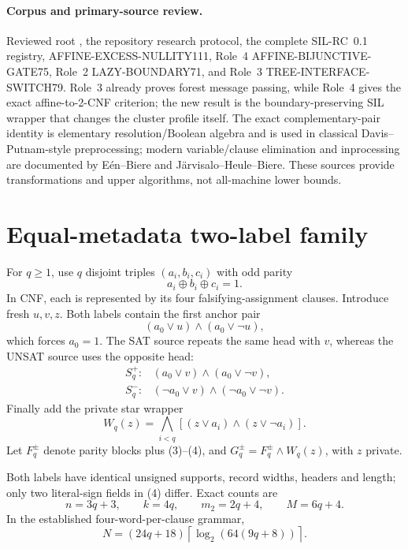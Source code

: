 \documentclass[11pt]{article}
\begin{document}
\paragraph{Corpus and primary-source review.}
Reviewed root , the repository research protocol, the complete
SIL-RC~0.1 registry, AFFINE-EXCESS-NULLITY111, Role~4
AFFINE-BIJUNCTIVE-GATE75, Role~2 LAZY-BOUNDARY71, and Role~3
TREE-INTERFACE-SWITCH79.  Role~3 already proves forest message passing, while
Role~4 gives the exact affine-to-2-CNF criterion; the new result is the
boundary-preserving SIL wrapper that changes the cluster profile itself.
The exact complementary-pair identity is elementary resolution/Boolean
algebra and is used in classical Davis--Putnam-style preprocessing; modern
variable/clause elimination and inprocessing are documented by
E\'en--Biere and J\"arvisalo--Heule--Biere.  These sources provide
transformations and upper algorithms, not all-machine lower bounds.

\section{Equal-metadata two-label family}
For $q\ge1$, use $q$ disjoint triples
$(a_i,b_i,c_i)$ with odd parity
\[
a_i\oplus b_i\oplus c_i=1.                                          \tag{2}
\]
In CNF, each is represented by its four falsifying-assignment clauses.
Introduce fresh $u,v,z$.  Both labels contain the first anchor pair
\[
(a_0\vee u)\land(a_0\vee\neg u),                                    \tag{3}
\]
which forces $a_0=1$.  The SAT source repeats the same head with $v$,
whereas the UNSAT source uses the opposite head:
\[
\begin{array}{ll}
S_q^+:&(a_0\vee v)\land(a_0\vee\neg v),\\
S_q^-:&(\neg a_0\vee v)\land(\neg a_0\vee\neg v).
\end{array}                                                          \tag{4}
\]
Finally add the private star wrapper
\[
W_q(z)=\bigwedge_{i<q}
[(z\vee a_i)\land(z\vee\neg a_i)].                                  \tag{5}
\]
Let $F_q^\pm$ denote parity blocks plus (3)--(4), and
$G_q^\pm=F_q^\pm\land W_q(z)$, with $z$ private.

Both labels have identical unsigned supports, record widths, headers and
length; only two literal-sign fields in (4) differ.  Exact counts are
\[
n=3q+3,\qquad k=4q,\qquad m_2=2q+4,\qquad M=6q+4.                    \tag{6}
\]
In the established four-word-per-clause grammar,
\[
N=(24q+18)\left\lceil\log_2(64(9q+8))\right\rceil.                  \tag{7}
\]
\end{document}
